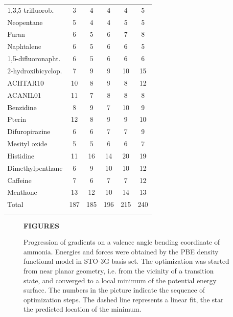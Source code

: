 \documentclass[prl,twocolumn,showpacs,twocolumngrid,superbib]{revtex4}
\begin{document}
{\begin{table}[h]
\begin{tabular}{lccccc}
1,3,5-trifluorob.      &   3    &   4    &    4    &    4   &   5     \\
Neopentane             &   5    &   4    &    4    &    5   &   5     \\
Furan                  &   6    &   5    &    6    &    7   &   8     \\
Naphtalene             &   6    &   5    &    6    &    6   &   5     \\
1,5-difluoronapht.     &   6    &   5    &    6    &    6   &   6     \\
2-hydroxibicyclop.     &   7    &   9    &    9    &   10   &  15     \\
ACHTAR10               &  10    &   8    &    9    &    8   &  12     \\
ACANIL01               &  11    &   7    &    8    &    8   &   8     \\
Benzidine              &   8    &   9    &    7    &   10   &   9     \\
Pterin                 &  12    &   8    &    9    &    9   &  10     \\
Difuropirazine         &   6    &   6    &    7    &    7   &   9     \\
Mesityl oxide          &   5    &   5    &    6    &    6   &   7     \\
Histidine              &  11    &  16    &   14    &   20   &  19     \\
Dimethylpenthane       &   6    &   9    &   10    &   10   &  12     \\
Caffeine               &   7    &   6    &    7    &    7   &  12     \\
Menthone               &  13    &  12    &   10    &   14   &  13     \\
\colrule
Total                  & 187    & 185    &  196    &  215   & 240     \\
\botrule
\end{tabular}
\end{table}


\clearpage

\begin{figure}[h]
\begin{center}
\bf  FIGURES\\[1.cm]
\end{center}

\caption{
Progression of gradients on a valence angle bending coordinate of
ammonia. Energies and forces were obtained by the PBE 
density functional model in STO-3G basis set.
The optimization was started from near planar geometry, i.e.
from the vicinity of a transition state, and converged to a local 
minimum of the potential energy surface. The numbers in the picture
indicate the sequence of optimization steps. The dashed line represents
a linear fit, the star the predicted location of the minimum.}\label{NH3outp6}


\end{figure}}
\end{document}
